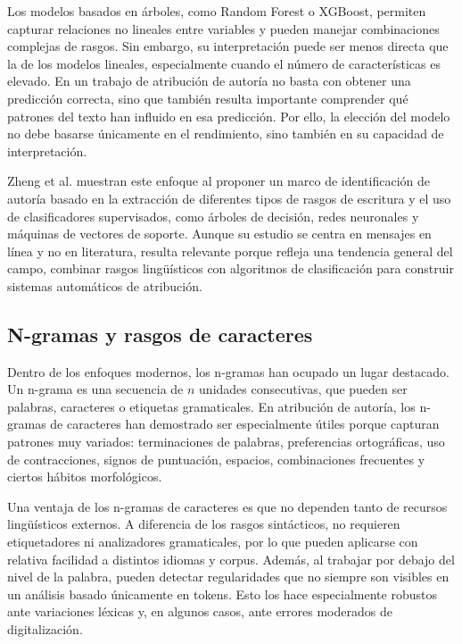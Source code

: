 \documentclass[IB]{TFUOC}%
\begin{document}
Los modelos basados en árboles, como Random Forest o XGBoost, permiten capturar relaciones no lineales entre variables y pueden manejar combinaciones complejas de rasgos. Sin embargo, su interpretación puede ser menos directa que la de los modelos lineales, especialmente cuando el número de características es elevado. En un trabajo de atribución de autoría no basta con obtener una predicción correcta, sino que también resulta importante comprender qué patrones del texto han influido en esa predicción. Por ello, la elección del modelo no debe basarse únicamente en el rendimiento, sino también en su capacidad de interpretación.

Zheng et al. muestran este enfoque al proponer un marco de identificación de autoría basado en la extracción de diferentes tipos de rasgos de escritura y el uso de clasificadores supervisados, como árboles de decisión, redes neuronales y máquinas de vectores de soporte\cite{zheng2006framework}. Aunque su estudio se centra en mensajes en línea y no en literatura, resulta relevante porque refleja una tendencia general del campo, combinar rasgos lingüísticos con algoritmos de clasificación para construir sistemas automáticos de atribución.

\subsection{N-gramas y rasgos de caracteres}

Dentro de los enfoques modernos, los n-gramas han ocupado un lugar destacado. Un n-grama es una secuencia de $n$ unidades consecutivas, que pueden ser palabras, caracteres o etiquetas gramaticales. En atribución de autoría, los n-gramas de caracteres han demostrado ser especialmente útiles porque capturan patrones muy variados: terminaciones de palabras, preferencias ortográficas, uso de contracciones, signos de puntuación, espacios, combinaciones frecuentes y ciertos hábitos morfológicos.

Una ventaja de los n-gramas de caracteres es que no dependen tanto de recursos lingüísticos externos. A diferencia de los rasgos sintácticos, no requieren etiquetadores ni analizadores gramaticales, por lo que pueden aplicarse con relativa facilidad a distintos idiomas y corpus. Además, al trabajar por debajo del nivel de la palabra, pueden detectar regularidades que no siempre son visibles en un análisis basado únicamente en tokens. Esto los hace especialmente robustos ante variaciones léxicas y, en algunos casos, ante errores moderados de digitalización.
\end{document}
